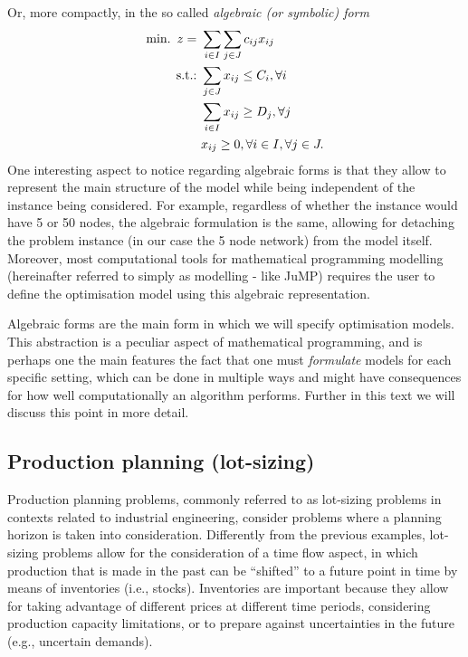Or, more compactly, in the so called \emph{algebraic (or symbolic) form}
%
\begin{align*}
	\mathop{\text{min.~}} z = \ &\sum_{i \in I}\sum_{j \in J}c_{ij}x_{ij}\\
	\mathop{\text{s.t.:~}} & \sum_{j \in J} x_{ij} \leq C_i, \forall i\\
	& \sum_{i \in I} x_{ij} \geq D_j, \forall j\\
	&x_{ij} \geq 0, \forall i \in I, \forall j \in J.
\end{align*}
%
One interesting aspect to notice regarding algebraic forms is that they allow to represent the main structure of the model while being independent of the instance being considered. For example, regardless of whether the instance would have 5 or 50 nodes, the algebraic formulation is the same, allowing for detaching the problem instance (in our case the 5 node network) from the model itself. Moreover, most computational tools for mathematical programming modelling (hereinafter referred to simply as modelling - like JuMP) requires the user to define the optimisation model using this algebraic representation.

Algebraic forms are the main form in which we will specify optimisation models. This abstraction is a peculiar aspect of mathematical programming, and is perhaps one the main features the fact that one must \emph{formulate} models for each specific setting, which can be done in multiple ways and might have consequences for how well computationally an algorithm performs. Further in this text we will discuss this point in more detail.  


\subsection{Production planning (lot-sizing)}


Production planning problems, commonly referred to as lot-sizing problems in contexts related to industrial engineering, consider problems where a planning horizon is taken into consideration. Differently from the previous examples, lot-sizing problems allow for the consideration of a time flow aspect, in which production that is made in the past can be ``shifted'' to a future point in time by means of inventories (i.e., stocks). Inventories are important because they allow for taking advantage of different prices at different time periods, considering production capacity limitations, or to prepare against uncertainties in the future (e.g., uncertain demands).

